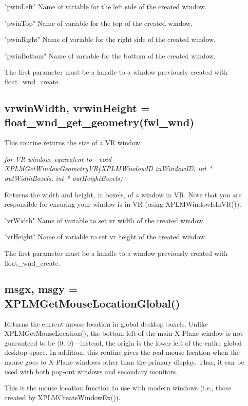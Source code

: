 \documentclass[11pt,parskip=half,a4paper]{scrartcl}
\begin{document}
"pwinLeft" Name of variable for the left side of the created window.

"pwinTop" Name of variable for the top of the created window.

"pwinRight" Name of variable for the right side of the created window.

"pwinBottom" Name of variable for the bottom of the created window.

The first parameter must be a handle to a window previously created with float\_wnd\_create.



\subsection{\hspace*{1.0mm}vrwinWidth, vrwinHeight = float\_wnd\_get\_geometry(fwl\_wnd)}

This routine returns the size of a VR window.

\emph{ for VR window, equivalent to       - void XPLMGetWindowGeometryVR(XPLMWindowID inWindowID, int * outWidthBoxels, int * outHeightBoxels)}

Returns the width and height, in boxels, of a window in VR. Note that you are responsible for ensuring your window is in VR (using XPLMWindowIsInVR()).

"vrWidth" Name of variable to set vr width of the created window.

"vrHeight" Name of variable to set vr height of the created window.

The first parameter must be a handle to a window previously created with float\_wnd\_create.

\newpage

\subsection{\hspace*{1.0mm}msgx, msgy = XPLMGetMouseLocationGlobal()}

Returns the current mouse location in global desktop boxels. Unlike XPLMGetMouseLocation(), the bottom left of the main X-Plane window is not guaranteed to be (0, 0)---instead, the origin is the lower left of the entire global desktop space. In addition, this routine gives the real mouse location when the mouse goes to X-Plane windows other than the primary display. Thus, it can be used with both pop-out windows and secondary monitors.

This is the mouse location function to use with modern windows (i.e., those created by XPLMCreateWindowEx()).
\end{document}
